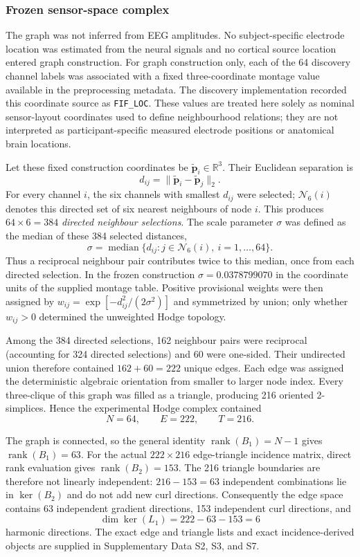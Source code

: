 \documentclass[12pt]{article}
\newcommand{\R}{\mathbb{R}}
\newcommand{\rankop}{\operatorname{rank}}
\begin{document}
\subsubsection{Frozen sensor-space complex}
The graph was not inferred from EEG amplitudes. No subject-specific electrode location was estimated from the neural signals and no cortical source location entered graph construction. For graph construction only, each of the 64 discovery channel labels was associated with a fixed three-coordinate montage value available in the preprocessing metadata. The discovery implementation recorded this coordinate source as \texttt{FIF\_LOC}. These values are treated here solely as nominal sensor-layout coordinates used to define neighbourhood relations; they are not interpreted as participant-specific measured electrode positions or anatomical brain locations.

Let these fixed construction coordinates be $\widetilde{\bm p}_i\in\R^3$. Their Euclidean separation is
\begin{equation}
d_{ij}=\|\widetilde{\bm p}_i-\widetilde{\bm p}_j\|_2.
\label{eq:exp_distance}
\end{equation}
For every channel $i$, the six channels with smallest $d_{ij}$ were selected; $\mathcal N_6(i)$ denotes this directed set of six nearest neighbours of node $i$. This produces $64\times6=384$ \emph{directed neighbour selections}. The scale parameter $\sigma$ was defined as the median of these 384 selected distances,
\[
\sigma=\operatorname{median}\{d_{ij}:j\in\mathcal N_6(i),\ i=1,\ldots,64\}.
\]
Thus a reciprocal neighbour pair contributes twice to this median, once from each directed selection. In the frozen construction $\sigma=0.0378799070$ in the coordinate units of the supplied montage table. Positive provisional weights were then assigned by $w_{ij}=\exp[-d_{ij}^2/(2\sigma^2)]$ and symmetrized by union; only whether $w_{ij}>0$ determined the unweighted Hodge topology.

Among the 384 directed selections, 162 neighbour pairs were reciprocal (accounting for 324 directed selections) and 60 were one-sided. Their undirected union therefore contained $162+60=222$ unique edges. Each edge was assigned the deterministic algebraic orientation from smaller to larger node index. Every three-clique of this graph was filled as a triangle, producing 216 oriented 2-simplices. Hence the experimental Hodge complex contained
\[
N=64,\qquad E=222,\qquad T=216.
\]

The graph is connected, so the general identity $\rankop(B_1)=N-1$ gives $\rankop(B_1)=63$. For the actual $222\times216$ edge-triangle incidence matrix, direct rank evaluation gives $\rankop(B_2)=153$. The 216 triangle boundaries are therefore not linearly independent: $216-153=63$ independent combinations lie in $\ker(B_2)$ and do not add new curl directions. Consequently the edge space contains 63 independent gradient directions, 153 independent curl directions, and
\begin{equation}
\dim\ker(L_1)=222-63-153=6
\label{eq:exp_harmdim}
\end{equation}
harmonic directions. The exact edge and triangle lists and exact incidence-derived objects are supplied in Supplementary Data S2, S3, and S7.
\end{document}
